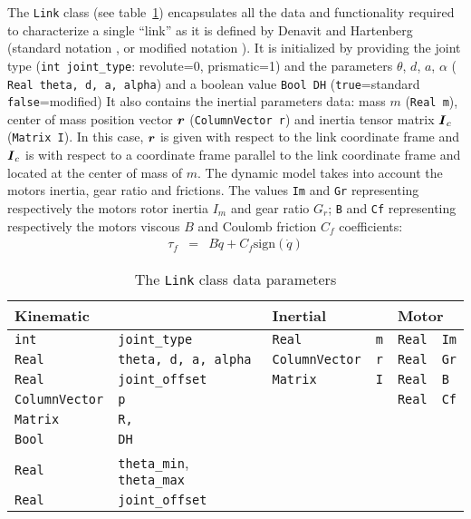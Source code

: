 \documentclass[dvips,11pt,fleqn]{report}
\newcommand{\mbold}[1]{\mbox{\boldmath $ #1 $}}
\begin{document}
The \texttt{Link} class (see table~\ref{tab:link}) encapsulates all
the data and functionality required to characterize a single ``link''
as it is defined by Denavit and Hartenberg (standard notation
\cite{denahart}, or modified notation \cite{craig}). It is initialized
by providing the joint type ({\tt int joint\_type}: revolute=0,
prismatic=1) and the parameters $\theta$, $d$, $a$, $\alpha$ ({\tt
  Real theta, d, a, alpha}) and a boolean value \texttt{Bool DH}
(\texttt{true}=standard \texttt{false}=modified) It also contains the
inertial parameters data: mass $m$ ({\tt Real m}), center of mass
position vector $\mbold{r}$ ({\tt ColumnVector r}) and inertia tensor
matrix $\mbold{I}_c$ ({\tt Matrix I}). In this case, $\mbold{r}$ is
given with respect to the link coordinate frame and $\mbold{I}_{c}$ is
with respect to a coordinate frame parallel to the link coordinate
frame and located at the center of mass of $m$.  The dynamic model
takes into account the motors inertia, gear ratio and frictions. The
values \texttt{Im} and \texttt{Gr} representing respectively the
motors rotor inertia $I_m$ and gear ratio $G_r$; \texttt{B} and
\texttt{Cf} representing respectively the motors viscous $B$ and
Coulomb friction $C_f$ coefficients:
  \begin{eqnarray*}
    \tau_{f}& = &  B \dot{q} + C_f \mbox{sign}(\dot{q})
  \end{eqnarray*}

\begin{table}[htbp]
  \caption{The \texttt{Link} class data parameters}
  \label{tab:link}
  \begin{center}
    \begin{tabular}{||ll|ll||ll||}
      \hline
      \hline
      \multicolumn{2}{||l|}{Kinematic} & \multicolumn{2}{l||}{Inertial} 
      & \multicolumn{2}{l||}{Motor} \\
      \hline
      \hline
      {\tt int} & {\tt joint\_type} & {\tt Real} & {\tt m} 
      & \texttt{Real} & \texttt{Im} \\
      {\tt Real} & {\tt theta, d, a, alpha} & {\tt ColumnVector} & {\tt r}
      & \texttt{Real} & \texttt{Gr} \\
      {\tt Real} & {\tt joint\_offset} & {\tt Matrix} & {\tt I}
      & \texttt{Real} & \texttt{B} \\
      {\tt ColumnVector} & {\tt p} & & & \texttt{Real} & \texttt{Cf} \\
      {\tt Matrix} & {\tt R,} & & & & \\
      \texttt{Bool} & \texttt{DH} & & & & \\
      \texttt{Real} & \texttt{theta\_min}, \texttt{theta\_max} & & & & \\
      \texttt{Real} & \texttt{joint\_offset} & & & & \\
      \hline
      \hline
    \end{tabular}
  \end{center}
\end{table}
\end{document}
